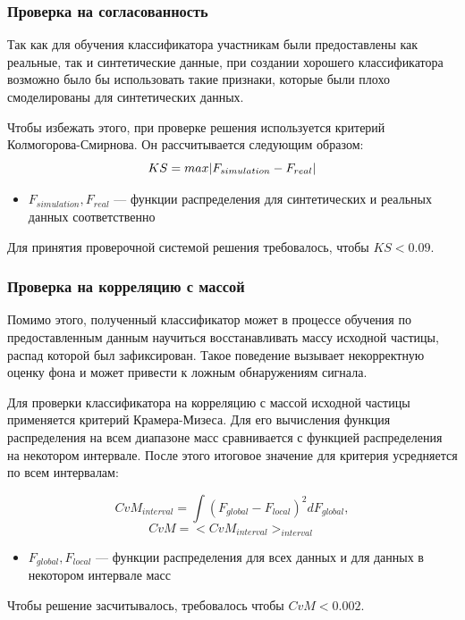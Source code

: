 \documentclass[14pt]{extarticle}
\DeclarePairedDelimiter{\abs}{\lvert}{\rvert}
\begin{document}
\subsubsection{Проверка на согласованность}
Так как для обучения классификатора участникам были предоставлены как реальные, так и синтетические данные, при создании хорошего классификатора возможно было бы использовать такие признаки, которые были плохо смоделированы для синтетических данных. 

Чтобы избежать этого, при проверке решения используется критерий Колмогорова-Смирнова. Он рассчитывается следующим образом:
\begin{equation*}
	KS = max \abs{F_{simulation} - F_{real}}
\end{equation*}
\begin{itemize}
	\item $F_{simulation}, F_{real}$ — функции распределения для синтетических и реальных данных соответственно
\end{itemize}
Для принятия проверочной системой решения требовалось, чтобы $KS < 0.09$.


\label{mass_metrics}
\subsubsection{Проверка на корреляцию с массой}
Помимо этого, полученный классификатор может в процессе обучения по предоставленным данным научиться восстанавливать массу исходной частицы, распад которой был зафиксирован. Такое поведение вызывает некорректную оценку фона и может привести к ложным обнаружениям сигнала.

Для проверки классификатора на корреляцию с массой исходной частицы применяется критерий Крамера-Мизеса. \cite{cramer} Для его вычисления функция распределения на всем диапазоне масс сравнивается с функцией распределения на некотором интервале. После этого итоговое значение для критерия усредняется по всем интервалам:

\begin{equation*}
	CvM_{interval} = \int (F_{global} - F_{local})^2 dF_{global},
\end{equation*}
\begin{equation*}
	CvM = <CvM_{interval}>_{interval}
\end{equation*}
\begin{itemize}
	\item $F_{global}, F_{local}$ — функции распределения для всех данных и для данных в некотором интервале масс
\end{itemize}
Чтобы решение засчитывалось, требовалось чтобы $CvM < 0.002$.
\end{document}
